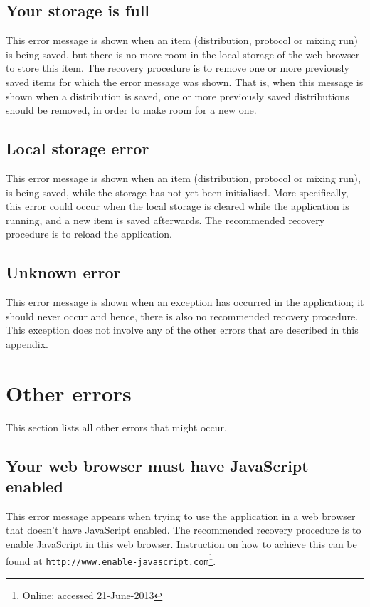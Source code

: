 \subsection{Your storage is full}
This error message is shown when an item (distribution, protocol or mixing run) is being saved, but there is no more room in the local storage of the web browser to store this item. The recovery procedure is to remove one or more previously saved items for which the error message was shown. That is, when this message is shown when a distribution is saved, one or more previously saved distributions should be removed, in order to make room for a new one.

\subsection{Local storage error}
This error message is shown when an item (distribution, protocol or mixing run), is being saved, while the storage has not yet been initialised. More specifically, this error could occur when the local storage is cleared while the application is running, and a new item is saved afterwards. The recommended recovery procedure is to reload the application. 

\subsection{Unknown error}
This error message is shown when an exception has occurred in the application; it should never occur and hence, there is also no recommended recovery procedure. This exception does not involve any of the other errors that are described in this appendix.

\section{Other errors}
This section lists all other errors that might occur.

\subsection{Your web browser must have JavaScript enabled}
This error message appears when trying to use the application in a web browser that doesn't have JavaScript enabled. The recommended recovery procedure is to enable JavaScript in this web browser. Instruction on how to achieve this can be found at \texttt{http://www.enable-javascript.com}\footnote{Online; accessed 21-June-2013}.

